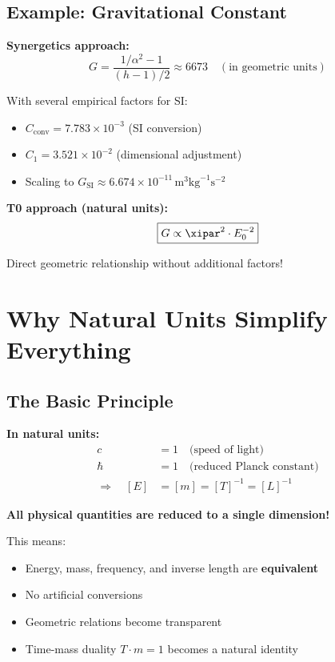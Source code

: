 	\subsection{Example: Gravitational Constant}
	
	\textbf{Synergetics approach:}
	\begin{equation}
		G = \frac{1/\alpha^2 - 1}{(h - 1)/2} \approx 6673 \quad (\text{in geometric units})
	\end{equation}
	
	With several empirical factors for SI:
	\begin{itemize}
		\item $C_{\text{conv}} = 7.783 \times 10^{-3}$ (SI conversion)
		\item $C_1 = 3.521 \times 10^{-2}$ (dimensional adjustment)
		\item Scaling to $G_{\text{SI}} \approx 6.674 \times 10^{-11} \, \text{m}^3 \text{kg}^{-1} \text{s}^{-2}$
	\end{itemize}
	
	\textbf{T0 approach (natural units):}
	\begin{equation}
		\boxed{G \propto \xipar^2 \cdot E_0^{-2}}
	\end{equation}
	
	Direct geometric relationship without additional factors!
	
	\section{Why Natural Units Simplify Everything}
	
	\subsection{The Basic Principle}
	
	\begin{vorteil}
		\textbf{In natural units:}
		\begin{align}
			c &= 1 \quad \text{(speed of light)} \\
			\hbar &= 1 \quad \text{(reduced Planck constant)} \\
			\Rightarrow \quad [E] &= [m] = [T]^{-1} = [L]^{-1}
		\end{align}
		
		\textbf{All physical quantities are reduced to a single dimension!}
		
		This means:
		\begin{itemize}
			\item Energy, mass, frequency, and inverse length are \textbf{equivalent}
			\item No artificial conversions
			\item Geometric relations become transparent
			\item Time-mass duality $T \cdot m = 1$ becomes a natural identity
		\end{itemize}
	\end{vorteil}
	
